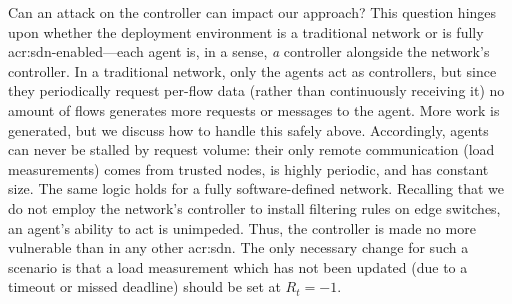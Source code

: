 Can an attack on the controller can impact our approach?
This question hinges upon whether the deployment environment is a traditional network or is fully \gls{acr:sdn}-enabled---each agent is, in a sense, \emph{a} controller alongside the network's controller.
In a traditional network, only the agents act as controllers, but since they periodically request per-flow data (rather than continuously receiving it) no amount of flows generates more requests or messages to the agent.
More work is generated, but we discuss how to handle this safely above.
Accordingly, agents can never be stalled by request volume: their only remote communication (load measurements) comes from trusted nodes, is highly periodic, and has constant size.
The same logic holds for a fully software-defined network.
Recalling that we do not employ the network's controller to install filtering rules on edge switches, an agent's ability to act is unimpeded.
Thus, the controller is made no more vulnerable than in any other \gls{acr:sdn}.
The only necessary change for such a scenario is that a load measurement which has not been updated (due to a timeout or missed deadline) should be set at $R_t=-1$.
%	
%
%	

